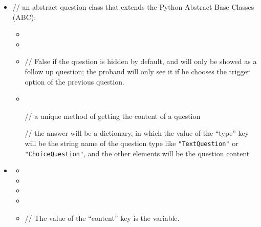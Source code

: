 \documentclass[a4paper]{scrreprt}
\begin{document}
\begin{itemize}
                    \item {}
                        \par // an abstract question class that extends the Python Abstract Base Classes (ABC): 
                        \begin{itemize}
                            \item {}
                            \item {}
                            \item {}
                                \par // False if the question is hidden by default, and will only be showed as a follow up question; the proband will only see it if he chooses the trigger option of the previous question.
                            \item {} \\
                                \par // a unique method of getting the content of a question
                                \par // the answer will be a dictionary, in which the value of the “type” key will be the string name of the question type like \verb|"TextQuestion"| or \verb|"ChoiceQuestion"|, and the other elements will be the question content
                        \end{itemize}

                    \item {}
                        \begin{itemize}
                            \item {}
                            \item {}
                            \item {}
                            \item {}
                            \item {}
                                \par // The value of the “content” key is the  variable.
                        \end{itemize}


\end{itemize}
\end{document}
